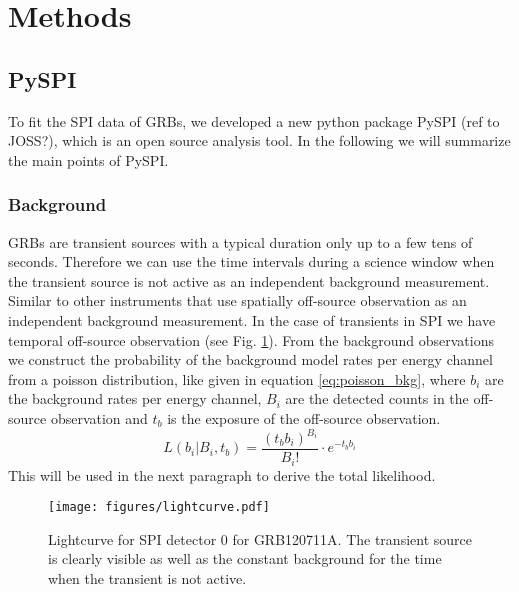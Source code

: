 \documentclass[twocolumn]{aa}
\begin{document}
\section{Methods}
\subsection{PySPI}
\label{pyspi}
To fit the SPI data of GRBs, we developed a new python package PySPI (ref to JOSS?), which is an open source analysis tool. In the following we will summarize the main points of PySPI.

\subsubsection*{Background}

GRBs are transient sources with a typical duration only up to a few tens of seconds.
Therefore we can use the time intervals during a science window when the transient source is not active as an independent background measurement. Similar to other instruments that use spatially off-source observation as an independent background measurement. In the case of transients in SPI we have temporal off-source observation (see Fig. \ref{fig:lightcurve}). From the background observations we construct the probability of the background model rates per energy channel from a poisson distribution, like given in equation \ref{eq:poisson_bkg}, where $b_{i}$ are the background rates per energy channel, $B_{i}$ are the detected counts in the off-source observation and $t_{b}$ is the exposure of the off-source observation.
\begin{equation}
	L(b_{i}|B_{i}, t_{b})=\frac{(t_{b} b_{i})^{B_{i}}}{B_{i}!}\cdot e^{-t_{b} b_{i}}
  \label{eq:poisson_bkg}
\end{equation}
This will be used in the next paragraph to derive the total likelihood.

\begin{figure}
    \begin{centering}
        \texttt{[image: figures/lightcurve.pdf]}
        \caption{Lightcurve for SPI detector 0 for GRB120711A. The transient source is clearly visible as well as the constant background for the time when the transient is not active.}
        \label{fig:lightcurve}
    \end{centering}
\end{figure}
\end{document}
